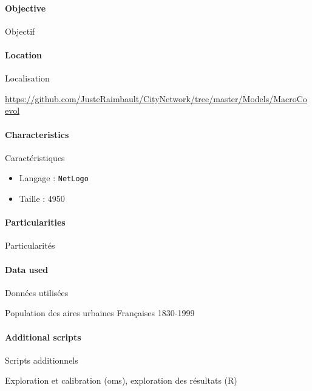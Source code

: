 \paragraph{Objective}{Objectif}



\paragraph{Location}{Localisation}

\url{https://github.com/JusteRaimbault/CityNetwork/tree/master/Models/MacroCoevol}

\paragraph{Characteristics}{Caractéristiques}

\begin{itemize}
\item Langage : \texttt{NetLogo}
\item Taille : 4950
\end{itemize}


\paragraph{Particularities}{Particularités}




\paragraph{Data used}{Données utilisées}

Population des aires urbaines Françaises 1830-1999

\paragraph{Additional scripts}{Scripts additionnels}

Exploration et calibration (oms), exploration des résultats (R)






